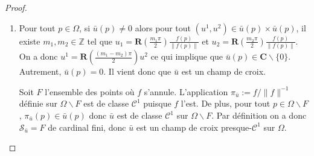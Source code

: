 \begin{proof}
\[\]
\vspace{-1cm}
\begin{enumerate}
\item Pour tout $p\in\Omega$, si $\bar{u}(p)\neq 0$ alors pour tout $(u^1, u^2)\in\bar{u}(p)\times\bar{u}(p)$, il existe $m_1,m_2\in\mathbb{Z}$ tel que $u_1=\mathbf{R}(\frac{m_1\pi}{2})\frac{f(p)}{\left\|f(p)\right\|}$ et $u_2=\mathbf{R}(\frac{m_2\pi}{2})\frac{f(p)}{\left\|f(p)\right\|}$. On a donc $u^1=\mathbf{R}(\frac{(m_1-m_2)\pi}{2})u^2$ ce qui implique que $\bar{u}(p)\in\mathbf{C}\backslash\{0\}$. Autrement, $\bar{u}(p)=0$. Il vient donc que $\bar{u}$ est un champ de croix.

Soit $F$ l'ensemble des points où $f$ s'annule. L'application $\pi_{\bar{u}}:=f/\|f\|^{-1}$ définie sur $\Omega\backslash F$ est de classe $\mathcal{C}^1$ puisque $f$ l'est. De plus, pour tout $p\in\Omega\backslash F$, $\pi_{\bar{u}}(p)\in\bar{u}(p)$ donc $\bar{u}$ est de classe $\mathcal{C}^1$ sur $\Omega\backslash F$. Par définition on a donc $\mathcal{S}_{\bar{u}}=F$ de cardinal fini, donc $\bar{u}$ est un champ de croix presque-$\mathcal{C}^1$ sur $\Omega$.\\


\end{enumerate}
\end{proof}
